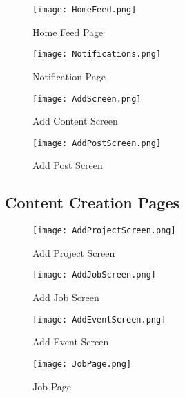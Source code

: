 \begin{figure}[htbp]
    \centering
    \begin{minipage}[b]{0.45\linewidth}
        \centering
        \texttt{[image: HomeFeed.png]}
        \caption{Home Feed Page}
        \label{fig:home-feed}
    \end{minipage}
    \hfill
    \begin{minipage}[b]{0.45\linewidth}
        \centering
        \texttt{[image: Notifications.png]}
        \caption{Notification Page}
        \label{fig:notifications}
    \end{minipage}
    \vspace{1em}

    \begin{minipage}[b]{0.45\linewidth}
        \centering
        \texttt{[image: AddScreen.png]}
        \caption{Add Content Screen}
        \label{fig:add-screen}
    \end{minipage}
    \hfill
    \begin{minipage}[b]{0.45\linewidth}
        \centering
        \texttt{[image: AddPostScreen.png]}
        \caption{Add Post Screen}
        \label{fig:add-post}
    \end{minipage}
\end{figure}

\subsection{Content Creation Pages}
\begin{figure}[htbp]
    \centering
    \begin{minipage}[b]{0.45\linewidth}
        \centering
        \texttt{[image: AddProjectScreen.png]}
        \caption{Add Project Screen}
        \label{fig:add-project}
    \end{minipage}
    \hfill
    \begin{minipage}[b]{0.45\linewidth}
        \centering
        \texttt{[image: AddJobScreen.png]}
        \caption{Add Job Screen}
        \label{fig:add-job}
    \end{minipage}
    \vspace{1em}
    
    \begin{minipage}[b]{0.45\linewidth}
        \centering
        \texttt{[image: AddEventScreen.png]}
        \caption{Add Event Screen}
        \label{fig:add-event}
    \end{minipage}
    \hfill
    \begin{minipage}[b]{0.45\linewidth}
        \centering
        \texttt{[image: JobPage.png]}
        \caption{Job Page}
        \label{fig:job-page}
    \end{minipage}
\end{figure}
